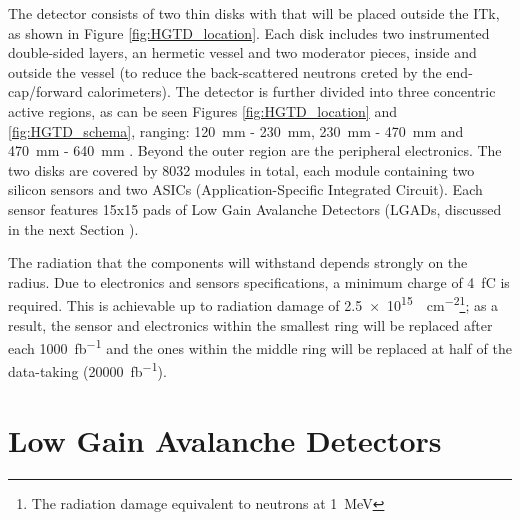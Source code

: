 The detector consists of two thin disks with that will be placed outside the ITk, as shown in Figure \ref{fig:HGTD_location}. Each disk includes two instrumented double-sided layers, an hermetic vessel and two moderator pieces, inside and outside the vessel (to reduce the back-scattered neutrons creted by the end-cap/forward calorimeters). The detector is further divided into three concentric active regions, as can be seen Figures \ref{fig:HGTD_location} and \ref{fig:HGTD_schema}, ranging: \qty{120}{\milli\meter} - \qty{230}{\milli\meter}, \qty{230}{\milli\meter} - \qty{470}{\milli\meter} and \qty{470}{\milli\meter} - \qty{640}{\milli\meter} \cite{CERN-LHCC-2020-007}. Beyond the outer region are the peripheral electronics.
The two disks are covered by 8032 modules in total, each module containing two silicon sensors and two ASICs (Application-Specific Integrated Circuit). Each sensor features 15x15 pads of Low Gain Avalanche Detectors (LGADs, discussed in the next Section ).

The radiation that the components will withstand depends strongly on the radius. Due to electronics and sensors specifications, a minimum charge of \qty{4}{\femto\coulomb} is required. This is achievable up to radiation damage of \qty{2.5e15}{\neutroneq\centi\meter^{-2}}\footnote{The radiation damage equivalent to neutrons at \qty{1}{\mega\electronvolt}}; as a result, the sensor and electronics within the smallest ring will be replaced after each \qty{1000}{\femto\barn^{-1}} and the ones within the middle ring will be replaced at half of the data-taking (\qty{20000}{\femto\barn^{-1}}).




\section{Low Gain Avalanche Detectors}

